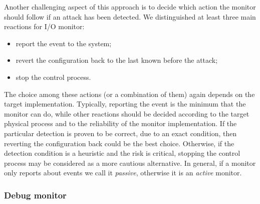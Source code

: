 Another challenging aspect of this approach is to decide which action the monitor should follow if an attack has been detected.
We distinguished at least three main reactions for I/O monitor:
\begin{itemize}
	\item report the event to the system;
	\item revert the configuration back to the last known before the attack;
	\item stop the control process.
\end{itemize}
The choice among these actions (or a combination of them) again depends on the target implementation.
Typically, reporting the event is the minimum that the monitor can do, while other reactions should be decided according to the target physical process
and to the reliability of the monitor implementation. If the particular detection is proven to be correct, due to an exact condition,
then reverting the configuration back could be the best choice. Otherwise, if the detection condition is a heuristic and the risk is critical,
stopping the control process may be considered as a more cautious alternative.
In general, if a monitor only reports about events we call it \emph{passive}, otherwise it is an \emph{active} monitor.


\subsubsection{Debug monitor}

